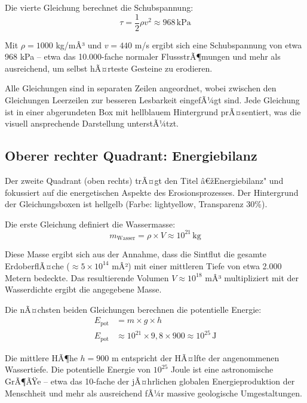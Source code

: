 ﻿\documentclass[12pt,a4paper]{report}
\begin{document}
Die vierte Gleichung berechnet die Schubspannung:
\begin{equation*}
	\tau = \frac{1}{2} \rho v^2 \approx 968 \, \mathrm{kPa}
\end{equation*}

Mit $\rho = 1000$ kg/mÂ³ und $v = 440$ m/s ergibt sich eine Schubspannung von etwa 968 kPa -- etwa das 10.000-fache normaler FlussstrÃ¶mungen und mehr als ausreichend, um selbst hÃ¤rteste Gesteine zu erodieren.

Alle Gleichungen sind in separaten Zeilen angeordnet, wobei zwischen den Gleichungen Leerzeilen zur besseren Lesbarkeit eingefÃ¼gt sind. Jede Gleichung ist in einer abgerundeten Box mit hellblauem Hintergrund prÃ¤sentiert, was die visuell ansprechende Darstellung unterstÃ¼tzt.

\subsection{Oberer rechter Quadrant: Energiebilanz}

Der zweite Quadrant (oben rechts) trÃ¤gt den Titel â€žEnergiebilanz" und fokussiert auf die energetischen Aspekte des Erosionsprozesses. Der Hintergrund der Gleichungsboxen ist hellgelb (Farbe: lightyellow, Transparenz 30\%).

Die erste Gleichung definiert die Wassermasse:
\begin{equation*}
	m_{\mathrm{Wasser}} = \rho \times V \approx 10^{21} \, \mathrm{kg}
\end{equation*}

Diese Masse ergibt sich aus der Annahme, dass die Sintflut die gesamte ErdoberflÃ¤che ($\approx 5 \times 10^{14}$ mÂ²) mit einer mittleren Tiefe von etwa 2.000 Metern bedeckte. Das resultierende Volumen $V \approx 10^{18}$ mÂ³ multipliziert mit der Wasserdichte ergibt die angegebene Masse.

Die nÃ¤chsten beiden Gleichungen berechnen die potentielle Energie:
\begin{align*}
	E_{\mathrm{pot}} &= m \times g \times h \\
	E_{\mathrm{pot}} &\approx 10^{21} \times 9{,}8 \times 900 \approx 10^{25} \, \mathrm{J}
\end{align*}

Die mittlere HÃ¶he $h = 900$ m entspricht der HÃ¤lfte der angenommenen Wassertiefe. Die potentielle Energie von $10^{25}$ Joule ist eine astronomische GrÃ¶ÃŸe -- etwa das 10-fache der jÃ¤hrlichen globalen Energieproduktion der Menschheit und mehr als ausreichend fÃ¼r massive geologische Umgestaltungen.
\end{document}
